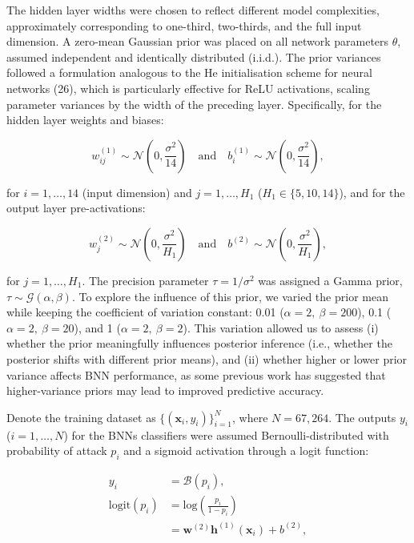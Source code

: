 \documentclass[
  a4paper,
]{scrreprt}
\begin{document}
The hidden layer widths were chosen to reflect different model
complexities, approximately corresponding to one-third, two-thirds, and
the full input dimension. A zero-mean Gaussian prior was placed on all
network parameters \(\theta\), assumed independent and identically
distributed (i.i.d.). The prior variances followed a formulation
analogous to the He initialisation scheme for neural networks (26),
which is particularly effective for ReLU activations, scaling parameter
variances by the width of the preceding layer. Specifically, for the
hidden layer weights and biases:

\[
w_{ij}^{(1)} \sim \mathcal{N}\left(0, \frac{\sigma^2}{14}\right) \quad \text{and} \quad b_{i}^{(1)} \sim \mathcal{N}\left(0, \frac{\sigma^2}{14}\right),
\]

for \(i = 1, \ldots, 14\) (input dimension) and \(j = 1, \ldots, H_1\)
(\(H_1 \in \{5, 10, 14\}\)), and for the output layer pre-activations:

\[
w_{j}^{(2)} \sim \mathcal{N}\left(0, \frac{\sigma^2}{H_1}\right) \quad \text{and} \quad b^{(2)} \sim \mathcal{N}\left(0, \frac{\sigma^2}{H_1}\right),
\]

for \(j = 1, \ldots, H_1\). The precision parameter \(\tau=1/\sigma^2\)
was assigned a Gamma prior, \(\tau \sim \mathcal{G}(\alpha, \beta)\). To
explore the influence of this prior, we varied the prior mean while
keeping the coefficient of variation constant: 0.01
(\(\alpha=2,\ \beta=200\)), 0.1 (\(\alpha=2,\ \beta=20\)), and 1
(\(\alpha=2,\ \beta=2\)). This variation allowed us to assess (i)
whether the prior meaningfully influences posterior inference (i.e.,
whether the posterior shifts with different prior means), and (ii)
whether higher or lower prior variance affects BNN performance, as some
previous work has suggested that higher-variance priors may lead to
improved predictive accuracy.

Denote the training dataset as \(\{(\mathbf{x}_i, y_i)\}_{i=1}^{N}\),
where \(N=67{,}264\). The outputs \(y_i\) (\(i=1,\ldots,N\)) for the
BNNs classifiers were assumed Bernoulli-distributed with probability of
attack \(p_i\) and a sigmoid activation through a logit function:

\[
\begin{aligned}
y_i &= \mathcal{B}(p_i), \\
\text{logit}(p_i) &= \text{log}\left(\frac{p_i}{1-p_i}\right) \\
&= \mathbf{w}^{(2)}\mathbf{h}^{(1)}(\mathbf{x}_i) + b^{(2)},
\end{aligned}
\]
\end{document}
